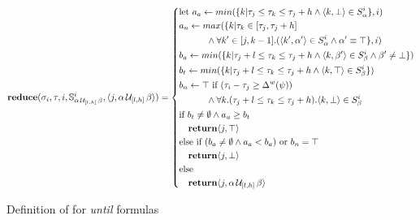 \begin{figure}
\small
\begin{align*}
\mathbf{reduce}(\sigma_i,\tau, i,\mathbb{S}^i_{\alpha\, \mathcal{U}_{[l,h]}\, \beta} ,\langle j, \alpha\, \mathcal{U}_{[l,h]}\, \beta \rangle) = \left\{
\begin{aligned}
&\text{let } a_a \leftarrow min(\{k | \tau_j \leq \tau_k \leq \tau_j+h  \wedge \langle k, \bot \rangle \in S^i_\alpha \},i) \\ 
& a_u \leftarrow max(\{k| \tau_k \in [\tau_j,\tau_j+h] \\
& \quad \quad \quad \wedge \forall k' \in [j,k-1].(\langle k', \alpha' \rangle \in S^i_\alpha \wedge \alpha' \equiv \top\},i) \\
& b_a \leftarrow min(\{k | \tau_j+l \leq \tau_k \leq \tau_j+h \wedge \langle k, \beta' \rangle \in S^i_\beta \wedge \beta' \neq \bot\}) \\ 
&b_t \leftarrow min(\{k | \tau_j+l \leq \tau_k \leq \tau_j+h \wedge \langle k, \top \rangle \in S^i_{\beta} \}) \\
&b_n \leftarrow \top \text{ if } (\tau_i - \tau_j \geq \Delta^w(\psi)) \\
& \quad \quad \quad \wedge \forall k.(\tau_j+l \leq \tau_k \leq \tau_j+h). \langle k, \bot \rangle \in S^i_{\beta} \\
&\text{if } b_t \neq \emptyset \wedge a_u \geq b_t \\
& \quad\mathbf{return} \langle j, \top \rangle \\
&\text{else if } (b_a \neq \emptyset \wedge a_a < b_a) \text{ or } b_n = \top\\ & \quad\mathbf{return} \langle j, \bot \rangle \\
&\text{else} \\
& \quad\mathbf{return} \langle j, \alpha\, \mathcal{U}_{[l,h]}\, \beta \rangle
\end{aligned} \right. \\
\end{align*}
\caption{Definition of \reduce for \emph{until} formulas \label{fig:until}}
\end{figure}


